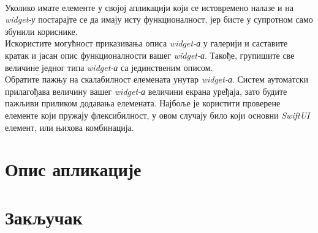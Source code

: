 \documentclass[12pt,oneside]{memoir}
\begin{document}
\\
\indent Уколико имате елементе у својој апликацији који се истовремено налазе и на \textit{widget-у} постарајте се да имају исту функционалност, јер бисте у супротном само збунили кориснике. 
\\
\indent Искористите могућност приказивања описа \textit{widget-а} у галерији и саставите кратак и јасан опис функционалности вашег \textit{widget-а}. Такође, групишите све величине једног типа \textit{widget-а} са јединственим описом.
\\
\indent Обратите пажњу на скалабилност елемената унутар \textit{widget-а}. Систем аутоматски прилагођава величину вашег \textit{widget-а} величини екрана уређаја, зато будите пажљиви приликом додавања елемената. Најбоље је користити проверене елементе који пружају флексибилност, у овом случају било који основни \textit{SwiftUI} елемент, или њихова комбинација.

\chapter{Опис апликације}

\chapter{Закључак}

\literatura
\end{document}
